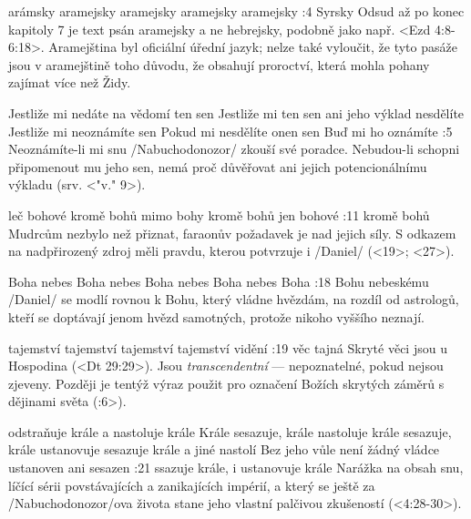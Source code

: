     {arámsky} %
    {aramejsky}  %
    {aramejsky} %
    {aramejsky}  %
    {aramejsky}  %
:4 {Syrsky} Odsud až po konec kapitoly 7 je text psán aramejsky a ne hebrejsky, podobně jako např.  <Ezd 4:8-6:18>. Aramejština byl oficiální úřední jazyk; nelze také vyloučit, že tyto pasáže jsou v aramejštině toho důvodu,  že obsahují proroctví, která mohla pohany zajímat více než Židy.

    {Jestliže mi nedáte na vědomí ten sen} %
    {Jestliže mi ten sen ani jeho výklad nesdělíte}  %
    {Jestliže mi neoznámíte sen} %
    {Pokud mi nesdělíte onen sen}  %
    {Buď mi ho oznámíte}  %
:5 {Neoznámíte-li mi snu} \x/Nabuchodonozor/ zkouší své poradce. Nebudou-li schopni připomenout mu jeho sen, nemá proč důvěřovat ani jejich potencionálnímu výkladu (srv. <"v." 9>).


    {leč bohové} %
    {kromě bohů}  %
    {mimo bohy} %
    {kromě bohů}  %
    {jen bohové}  %
:11 {kromě bohů} Mudrcům nezbylo než přiznat, faraonův požadavek je nad jejich síly. S odkazem na nadpřirozený zdroj měli pravdu, kterou potvrzuje i \x/Daniel/ (<19>; <27>).


    {Boha nebes} %
    {Boha nebes}  %
    {Boha nebes} %
    {Boha nebes}  %
    {Boha}  %
:18 {Bohu nebeskému} \x/Daniel/ se modlí rovnou k Bohu, který vládne hvězdám, na rozdíl od astrologů, kteří se doptávají jenom hvězd samotných, protože nikoho vyššího neznají.


    {tajemství} %
    {tajemství}  %
    {tajemství} %
    {tajemství}  %
    {vidění}  %
:19 {věc tajná} Skryté věci jsou u Hospodina (<Dt 29:29>). Jsou {\em transcendentní} --- nepoznatelné, pokud nejsou zjeveny. Později je tentýž výraz použit pro označení Božích skrytých záměrů s dějinami světa (:6>). 

    {odstraňuje krále a nastoluje krále} %
    {Krále sesazuje, krále nastoluje}  %
    {krále sesazuje, krále ustanovuje} %
    {sesazuje krále a jiné nastolí}  %
    {Bez jeho vůle není žádný vládce ustanoven ani sesazen}  %
:21 {ssazuje krále, i ustanovuje krále} Narážka na obsah snu, líčící sérii povstávajících a zanikajících impérií, a který se ještě za \x/Nabuchodonozor/ova života stane jeho vlastní palčivou zkušeností (<4:28-30>). 

